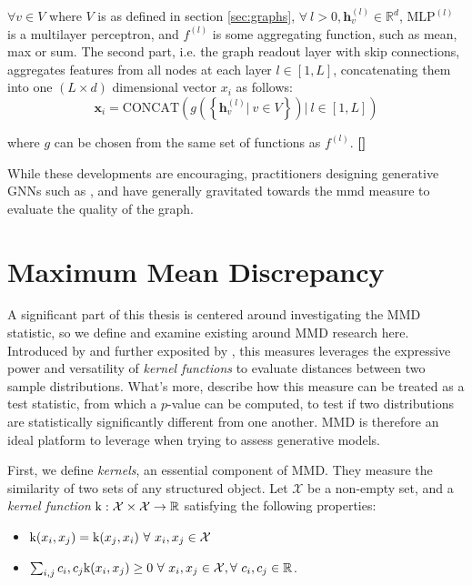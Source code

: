 $\forall v\in V$ where $V$ is as defined in section \ref{sec:graphs},
$\forall\ l>0, \mathbf{h}_{v}^{(l)}\in\mathbb{R}^d$, $\text{MLP}^{(l)}$ is a
multilayer perceptron, and $f^{(l)}$ is some aggregating function, such as mean,
max or sum. The second part, i.e. the graph readout layer with skip connections,
aggregates features from all nodes at each layer $l\in [1,L]$, concatenating
them into one $(L\times d)$ dimensional vector $x_i$ as follows:
\begin{equation}
  \label{eq:readout_gin}
  \mathbf{x}_i = \text{CONCAT}\left(  g\left( \left\{ \mathbf{h}_{v}^{(l)} |\ v\in V \right\} \right) |\ l \in [1, L] \right)
\end{equation}

where $g$ can be chosen from the same set of functions as $f^{(l)}$. \textbf{[]}

While these developments are encouraging, practitioners designing generative
GNNs such as \cite{liao2019efficient, niu2020permutation}, and
\cite{you2018graphrnn} have generally gravitated towards the \acrfull{mmd} measure to evaluate the quality of the graph.

\section{Maximum Mean Discrepancy}\label{sec:mmd}

A significant part of this thesis is centered around investigating the MMD
statistic, so we define and examine existing around MMD research here. Introduced by
\cite{borgwardt2006integrating} and further exposited by
\cite{gretton2012kernel}, this measures leverages the expressive power and
versatility of \emph{kernel functions} to evaluate distances between two sample
distributions. What's more, \cite{gretton2012kernel} describe how this measure
can be treated as a test statistic, from which a $p$-value can be computed, to
test if two distributions are statistically significantly different from one
another. MMD is therefore an ideal platform to leverage when trying to assess
generative models.

First, we define \emph{kernels}, an essential component of MMD. They measure the
similarity of two sets of any structured object. Let $\mathcal{X}$ be a
non-empty set, and a \emph{kernel function}
$\text{k}:\mathcal{X}\times \mathcal{X}\to\mathbb{R} $ satisfying the following
properties:

\begin{itemize}
\item $\tk(x_i,x_j)=\tk(x_j,x_i)\ \forall\ x_i,x_j\in\mathcal{X}$
\item $\sum_{i,j}c_i,c_j\tk(x_i,x_j)\geq 0\ \forall\ x_i,x_j\in\mathcal{X},
  \forall\ c_i,c_j\in\R$.
\end{itemize}

